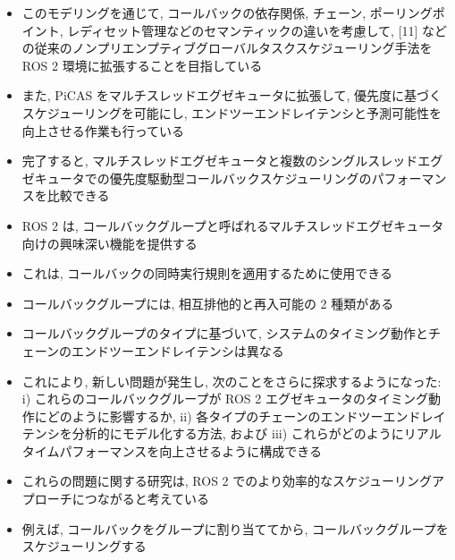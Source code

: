 \begin{frame}{}
    \begin{itemize}
        \item このモデリングを通じて, コールバックの依存関係, チェーン, ポーリングポイント, レディセット管理などのセマンティックの違いを考慮して, [11] などの従来のノンプリエンプティブグローバルタスクスケジューリング手法を ROS 2 環境に拡張することを目指している
        \item また, PiCAS をマルチスレッドエグゼキュータに拡張して, 優先度に基づくスケジューリングを可能にし, エンドツーエンドレイテンシと予測可能性を向上させる作業も行っている
        \item 完了すると, マルチスレッドエグゼキュータと複数のシングルスレッドエグゼキュータでの優先度駆動型コールバックスケジューリングのパフォーマンスを比較できる
    \end{itemize}
\end{frame}

\begin{frame}{}
    \begin{itemize}
        \item ROS 2 は, コールバックグループと呼ばれるマルチスレッドエグゼキュータ向けの興味深い機能を提供する
        \item これは, コールバックの同時実行規則を適用するために使用できる
        \item コールバックグループには, 相互排他的と再入可能の 2 種類がある
        \item コールバックグループのタイプに基づいて, システムのタイミング動作とチェーンのエンドツーエンドレイテンシは異なる
        \item これにより, 新しい問題が発生し, 次のことをさらに探求するようになった: i) これらのコールバックグループが ROS 2 エグゼキュータのタイミング動作にどのように影響するか, ii) 各タイプのチェーンのエンドツーエンドレイテンシを分析的にモデル化する方法, および iii) これらがどのようにリアルタイムパフォーマンスを向上させるように構成できる
        \item これらの問題に関する研究は, ROS 2 でのより効率的なスケジューリングアプローチにつながると考えている
        \item 例えば, コールバックをグループに割り当ててから, コールバックグループをスケジューリングする
    \end{itemize}
\end{frame}
